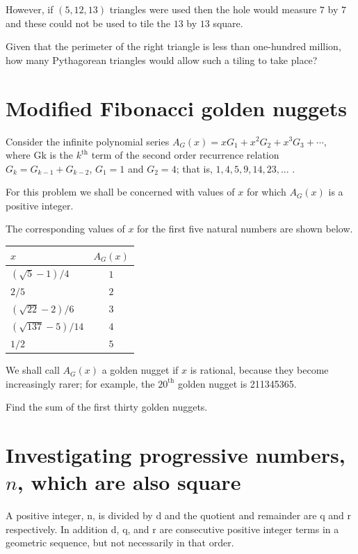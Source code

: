 However, if $(5, 12, 13)$ triangles were used then the hole would measure $7$ by $7$ and these could not be used to tile the $13$ by $13$ square.

Given that the perimeter of the right triangle is less than one-hundred million, how many Pythagorean triangles would allow such a tiling to take place?


\section{Modified Fibonacci golden nuggets} \label{pb.0140}

Consider the infinite polynomial series $A_G(x) = xG_1 + x^2G_2 + x^3G_3 + \cdots,$ where Gk is the $k^{\text{th}}$ term of the second order recurrence relation $G_k = G_{k-1} + G_{k-2}$, $G_1 = 1$ and $G_2 = 4$; that is, $1, 4, 5, 9, 14, 23, ...$ .


For this problem we shall be concerned with values of $x$ for which $A_G(x)$ is a positive integer.

The corresponding values of $x$ for the first five natural numbers are shown below.

\begin{center}
    \begin{tabular}{|l|c|}
        \hline
        $x$ & $A_G(x)$\\
        \hline
        $(\sqrt{5}-1)/4$ & $1$\\
        \hline
        $2/5$ & $2$\\
        \hline
        $(\sqrt{22}-2)/6$ & $3$\\
        \hline
        $(\sqrt{137}-5)/14$ & $4$\\
        \hline
        $1/2$ & $5$\\
        \hline
    \end{tabular}
\end{center}

We shall call $A_G(x)$ a golden nugget if $x$ is rational, because they become increasingly rarer; for example, the $20^{\text{th}}$ golden nugget is 211345365.

Find the sum of the first thirty golden nuggets.


\section{Investigating progressive numbers, $n$, which are also square} \label{pb.0141}

A positive integer, n, is divided by d and the quotient and remainder are q and r respectively. In addition d, q, and r are consecutive positive integer terms in a geometric sequence, but not necessarily in that order.

